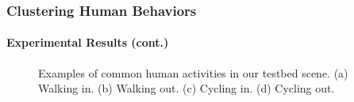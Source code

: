 \begin{frame}
    \frametitle{Clustering Human Behaviors}
    \framesubtitle{Experimental Results (cont.)}
    
    \begin{figure}
        \centering
        \hspace{0.05in}
        \hspace{0.05in}
        \hspace{0.05in}
        \caption{Examples of common human activities in our 
            testbed scene. (a) Walking in. (b) Walking out. 
            (c) Cycling in. (d) Cycling out.}
        \label{fig:example-behavior}
    \end{figure}

\end{frame}


